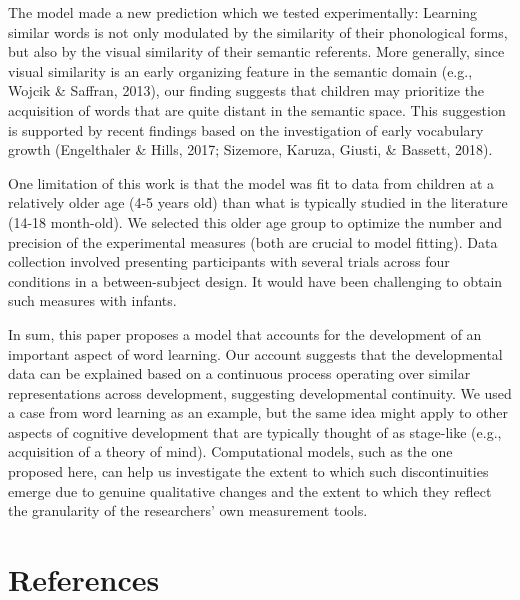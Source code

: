 \documentclass[10pt, letterpaper]{article}
\begin{document}
The model made a new prediction which we tested experimentally: Learning
similar words is not only modulated by the similarity of their
phonological forms, but also by the visual similarity of their semantic
referents. More generally, since visual similarity is an early
organizing feature in the semantic domain (e.g., Wojcik \& Saffran,
2013), our finding suggests that children may prioritize the acquisition
of words that are quite distant in the semantic space. This suggestion
is supported by recent findings based on the investigation of early
vocabulary growth (Engelthaler \& Hills, 2017; Sizemore, Karuza, Giusti,
\& Bassett, 2018).

One limitation of this work is that the model was fit to data from
children at a relatively older age (4-5 years old) than what is
typically studied in the literature (14-18 month-old). We selected this
older age group to optimize the number and precision of the experimental
measures (both are crucial to model fitting). Data collection involved
presenting participants with several trials across four conditions in a
between-subject design. It would have been challenging to obtain such
measures with infants.

In sum, this paper proposes a model that accounts for the development of
an important aspect of word learning. Our account suggests that the
developmental data can be explained based on a continuous process
operating over similar representations across development, suggesting
developmental continuity. We used a case from word learning as an
example, but the same idea might apply to other aspects of cognitive
development that are typically thought of as stage-like (e.g.,
acquisition of a theory of mind). Computational models, such as the one
proposed here, can help us investigate the extent to which such
discontinuities emerge due to genuine qualitative changes and the extent
to which they reflect the granularity of the researchers' own
measurement tools.

\vspace{1em}

\vspace{1em}

\section{References}\label{references}
\end{document}
